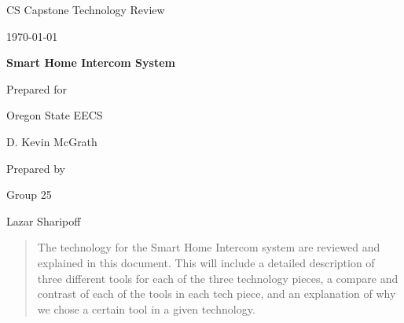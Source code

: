 \documentclass[onecolumn, draftclsnofoot,10pt, compsoc]{IEEEtran}
\def \CapstoneTeamName{		}
\def \CapstoneTeamNumber{		25}
\def \GroupMemberOne{			Lazar Sharipoff}
\def \GroupMemberTwo{			}
\def \GroupMemberThree{			}
\def \CapstoneProjectName{		Smart Home Intercom System}
\def \CapstoneSponsorCompany{	Oregon State EECS}
\def \CapstoneSponsorPerson{		D. Kevin McGrath}
\def \DocType{		%
				Technology Review
				}
\newcommand{\NameSigPair}[1]{\par
\makebox[2.75in][r]{#1} \hfil 	\makebox[3.25in]{\makebox[2.25in]{\hrulefill} \hfill		\makebox[.75in]{\hrulefill}}
\par\vspace{-12pt} \textit{\tiny\noindent
\makebox[2.75in]{} \hfil		\makebox[3.25in]{\makebox[2.25in][r]{Signature} \hfill	\makebox[.75in][r]{Date}}}}
\renewcommand{\NameSigPair}[1]{#1}
\begin{document}
\begin{titlepage}
    \begin{singlespace}
        \hfill 
        \par\vspace{.2in}
        \centering
        \scshape{
            \huge CS Capstone \DocType \par
            {\large\today}\par
            \vspace{.5in}
            \textbf{\Huge\CapstoneProjectName}\par
            \vfill
            {\large Prepared for}\par
            \Huge \CapstoneSponsorCompany\par
            \vspace{5pt}
            {\Large\NameSigPair{\CapstoneSponsorPerson}\par}
            {\large Prepared by }\par
            Group\CapstoneTeamNumber\par
            \CapstoneTeamName\par 
            \vspace{5pt}
            {\Large
                \NameSigPair{\GroupMemberOne}\par
                \NameSigPair{\GroupMemberTwo}\par
                \NameSigPair{\GroupMemberThree}\par
            }
            \vspace{20pt}
        }
        \begin{abstract}
        	The technology for the Smart Home Intercom system are reviewed and explained in this document. This will include a detailed description of three different tools for each of the three technology pieces, a compare and contrast of each of the tools in each tech piece, and an explanation of why we chose a certain tool in a given technology.
        \end{abstract}     
    \end{singlespace}
\end{titlepage}
\newpage
{}
\tableofcontents
\end{document}
